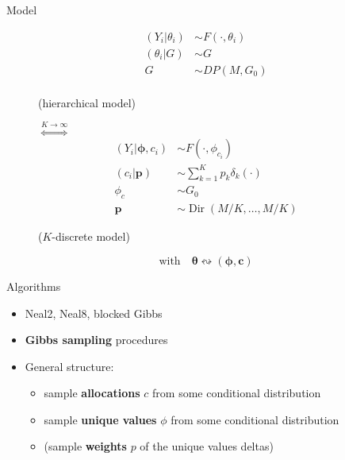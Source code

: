 
\begin{frame}{Model}
\begin{figure}[htpb] 
	\begin{align*}
	(Y_{i}|\theta_{i})&\sim F(\cdot,\theta_i) \\
	(\theta_{i}|G)&\sim G \\
	G & \sim DP(M,G_{0}) \\
	\end{align*}
	\begin{center}
		(hierarchical model)
	\end{center}
	\endminipage 
	$\stackrel{K\to\infty}{\iff}$
	\endminipage
	\begin{align*}
	(Y_{i}|\mathbf{\phi},c_{i})&\sim F(\cdot,\phi_{c_{i}}) \\
	(c_{i}|\mathit{\mathbf{p}})&\sim \sum_{k=1}^K\mathit{p_k} \delta_k(\cdot) \\
	\phi_{c} & \sim G_{0} \\
	\mathbf{p} &\sim \operatorname{Dir}(M/K,\dots,M/K)
	\end{align*}
	\begin{center}
		($K$-discrete model)
	\end{center}
	\endminipage  
\end{figure}
\begin{center}
	$$\text{with} \quad \boldsymbol\theta \leftrightsquigarrow (\boldsymbol\phi, \mathbf c)$$
\end{center}
\end{frame}


\begin{frame}{Algorithms}
	\begin{itemize}
		\item Neal2, Neal8, blocked Gibbs
		\item \textbf{Gibbs sampling} procedures
		\item General structure:
		\begin{itemize}
			\item sample \textbf{allocations} $c$ from some conditional distribution
			\item sample \textbf{unique values} $\phi$ from some conditional distribution
			\item (sample \textbf{weights} $p$ of the unique values deltas)
		\end{itemize}
	\end{itemize}
\end{frame}


